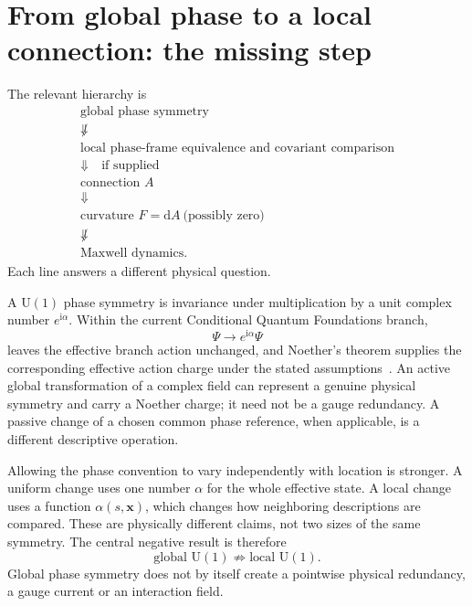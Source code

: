 \documentclass[11pt]{article}
\theoremstyle{definition}
\newcommand{\dd}{\mathrm{d}}
\newcommand{\ii}{\mathrm{i}}
\newcommand{\Uone}{\mathrm{U}(1)}
\begin{document}
\section{From global phase to a local connection: the missing step}
\label{sec:phase_to_connection}

The relevant hierarchy is
\begin{equation}
\boxed{
\begin{array}{c}
\text{global phase symmetry}\\
\not\Downarrow\\
\text{local phase-frame equivalence and covariant comparison}\\
\Downarrow\quad\text{if supplied}\\
\text{connection }A\\
\Downarrow\\
\text{curvature }F=\dd A\ \text{(possibly zero)}\\
\not\Downarrow\\
\text{Maxwell dynamics}.
\end{array}}
\label{eq:gauge_hierarchy}
\end{equation}
Each line answers a different physical question.

A $\Uone$ phase symmetry is invariance under multiplication by a unit complex number $e^{\ii\alpha}$.  Within the current Conditional Quantum Foundations branch,
\begin{equation}
 \Psi\longrightarrow e^{\ii\alpha}\Psi
 \label{eq:global_phase}
\end{equation}
leaves the effective branch action unchanged, and Noether's theorem supplies the corresponding effective action charge under the stated assumptions~\cite{CmotionQuantumFoundations2026}.  An active global transformation of a complex field can represent a genuine physical symmetry and carry a Noether charge; it need not be a gauge redundancy.  A passive change of a chosen common phase reference, when applicable, is a different descriptive operation.

Allowing the phase convention to vary independently with location is stronger.  A uniform change uses one number $\alpha$ for the whole effective state.  A local change uses a function $\alpha(s,\mathbf x)$, which changes how neighboring descriptions are compared.  These are physically different claims, not two sizes of the same symmetry.  The central negative result is therefore
\begin{equation}
 \boxed{\text{global }\Uone\not\Rightarrow\text{local }\Uone.}
 \label{eq:global_not_local}
\end{equation}
Global phase symmetry does not by itself create a pointwise physical redundancy, a gauge current or an interaction field.
\end{document}
